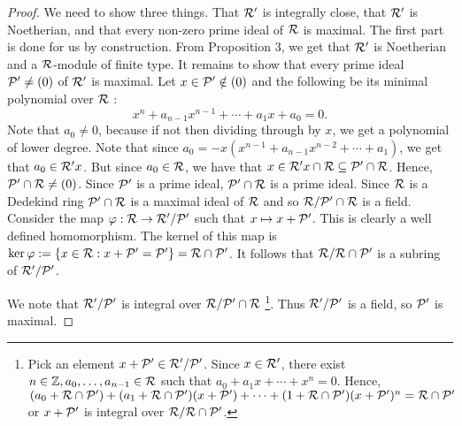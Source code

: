 \begin{proof}
  We need to show three things. That $\mathcal{R}'$ is integrally close, that $\mathcal{R}'$ is Noetherian, and that every non-zero prime ideal of $\mathcal{R}$ is maximal. The first part is done for us by construction. From Proposition $3$, we get that $\mathcal{R}'$ is Noetherian and a $\mathcal{R}$-module of finite type. It remains to show that every prime ideal $\mathcal{P}'\neq (0)$ of $\mathcal{R}'$ is maximal. Let $x\in \mathcal{P}'\notin (0)$ and the following be its minimal polynomial over $\mathcal{R}$ :
  \[x^n + a_{n-1}x^{n-1}+\cdots+a_1 x + a_0 = 0\tag{$a_i\in \calr$}.\]
  Note that $a_0\neq 0$, because if not then dividing through by $x$, we get a polynomial of lower degree. Note that since $a_0 = -x(x^{n-1}+a_{n-1}x^{n-2}+\cdots + a_1)$, we get that $a_0 \in \mathcal{R}' x$. But since $a_0 \in \mathcal{R}$, we have that $x\in \mathcal{R}' x \cap \mathcal{R} \subseteq \mathcal{P}'\cap \mathcal{R}$. Hence, $\mathcal{P}'\cap \mathcal{R} \neq (0)$.
  Since $\mathcal{P}'$ is a prime ideal, $\mathcal{P}'\cap \mathcal{R}$ is a prime ideal. Since $\mathcal{R}$ is a Dedekind ring $\mathcal{P}'\cap \mathcal{R}$ is a maximal ideal of $\mathcal{R}$ and so $\mathcal{R}/\mathcal{P}'\cap\mathcal{R}$ is a field.
  Consider the map $\varphi : \mathcal{R} \to \mathcal{R}'/\mathcal{P}'$ such that $x\mapsto x+\mathcal{P}'$. This is clearly a well defined homomorphism. The kernel of this map is $\ker{\varphi}:=\{x\in \mathcal{R} : x+\mathcal{P}' = \mathcal{P}'\} = \mathcal{R} \cap \mathcal{P}'$. It follows that $\mathcal{R}/\mathcal{R}\cap \mathcal{P}'$ is a subring of $\mathcal{R}'/\mathcal{P}'$.


  We note that $\mathcal{R}'/\mathcal{P}'$ is integral over $\mathcal{R}/\mathcal{P}'\cap \mathcal{R}$
  \footnote{Pick an element $x+\mathcal{P}' \in \mathcal{R}'/\mathcal{P}'$. Since $x\in \mathcal{R}'$, there exist $n\in \mathbb{Z}, a_0,\ldots, a_{n-1} \in \mathcal{R}$ such that $a_0 + a_1 x + \cdots + x^n = 0$. Hence, $(a_0 + \mathcal{R}\cap \mathcal{P}') + (a_1+\mathcal{R}\cap \mathcal{P}') (x+\mathcal{P}')+\cdots + (1+\mathcal{R}\cap \mathcal{P}')(x+\mathcal{P}')^n = \mathcal{R}\cap \mathcal{P}'$ or
  $x+\mathcal{P}'$ is integral over $\mathcal{R}/\mathcal{R}\cap \mathcal{P}'$.}. Thus $\mathcal{R}'/\mathcal{P}'$ is a field, so $\mathcal{P}'$ is maximal.
\end{proof}


